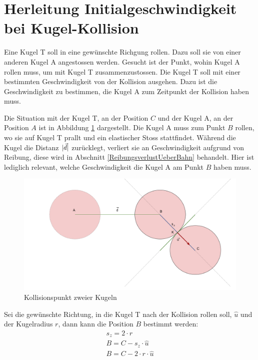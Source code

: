 \section{Herleitung Initialgeschwindigkeit bei Kugel-Kollision}\label{anhang:herleitung:ballCollisionReverse}
Eine Kugel T soll in eine gewünschte Richgung rollen. Dazu soll sie von einer anderen Kugel A angestossen werden.
Gesucht ist der Punkt, wohin Kugel A rollen muss, um mit Kugel T zusammenzustossen.
Die Kugel T soll mit einer bestimmten Geschwindigkeit von der Kollision ausgehen.
Dazu ist die Geschwindigkeit zu bestimmen, die Kugel A  zum Zeitpunkt der Kollision haben muss.

Die Situation mit der Kugel T, an der Position $C$ und der Kugel A, an der Position $A$ ist in Abbildung \ref{fig:ballCollisionPointReverse}
dargestellt. Die Kugel A muss zum Punkt $B$ rollen, wo sie auf Kugel T prallt und ein elastischer Stoss\cite{wiki.elastischer_stoss_physik:1} stattfindet.
Während die Kugel die Distanz $\lvert \vec{d} \rvert$ zurücklegt, verliert sie an Geschwindigkeit aufgrund von Reibung,
diese wird in Abschnitt \ref{ReibungsverlustUeberBahn} behandelt. Hier ist lediglich relevant, welche Geschwindigkeit
die Kugel A am Punkt $B$ haben muss.

\begin{figure}[h!]
    \begin{center}
        \includegraphics[width=0.6\linewidth]{../common/03_billiard_ai/resources/21_kollisionspunkt_rueckwaerts.png}
    \end{center}
    \caption{Kollisionspunkt zweier Kugeln}
    \label{fig:ballCollisionPointReverse}
\end{figure}

Sei die gewünschte Richtung, in die Kugel T nach der Kollision rollen soll, $\hat{u}$ und der Kugelradius $r$, dann kann die Position $B$ bestimmt werden:
\begin{align}
    s_z = 2 \cdot r\\
    B = C - s_z \cdot \hat{u}\\
    B = C - 2 \cdot r \cdot \hat{u}
\end{align}

